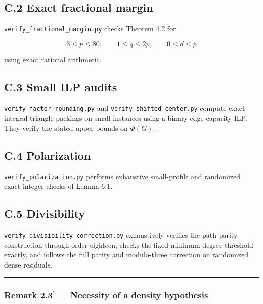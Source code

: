 \documentclass[english,11pt,a4paper]{article}
\begin{document}
\subsection{C.2 Exact fractional
margin}\label{c.2-exact-fractional-margin}

\nolinkurl{verify_fractional_margin.py} checks Theorem 4.2 for

\[
3\le p\le80,
\qquad
1\le q\le2p,
\qquad
0\le d\le p
\]

using exact rational arithmetic.

\subsection{C.3 Small ILP audits}\label{c.3-small-ilp-audits}

\nolinkurl{verify_factor_rounding.py} and
\nolinkurl{verify_shifted_center.py} compute exact integral triangle
packings on small instances using a binary edge-capacity ILP. They
verify the stated upper bounds on \(\Phi(G)\).

\subsection{C.4 Polarization}\label{c.4-polarization}

\nolinkurl{verify_polarization.py} performs exhaustive small-profile and
randomized exact-integer checks of Lemma 6.1.

\subsection{C.5 Divisibility}\label{c.5-divisibility}

\nolinkurl{verify_divisibility_correction.py} exhaustively verifies the
path parity construction through order eighteen, checks the fixed
minimum-degree threshold exactly, and follows the full parity and
modulo-three correction on randomized dense residuals.

\begin{center}\rule{0.5\linewidth}{0.5pt}\end{center}

\subsubsection{\texorpdfstring{Remark 2.3\(^{\prime}\) --- Necessity of
a density
hypothesis}{Remark 2.3\^{}\{\textbackslash prime\} --- Necessity of a density hypothesis}}\label{remark-2.3prime-necessity-of-a-density-hypothesis}
\end{document}
